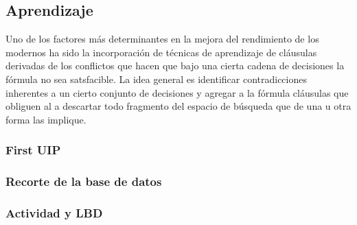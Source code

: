 \subsection{Aprendizaje}
Uno de los factores más determinantes en la mejora del rendimiento de los \ssolver modernos ha sido la incorporación de técnicas de aprendizaje de cláusulas derivadas de los conflictos que hacen que bajo una cierta cadena de decisiones la fórmula no sea satsfacible. La idea general es identificar contradicciones inherentes a un cierto conjunto de decisiones y agregar a la fórmula cláusulas que obliguen al \ssolver a descartar todo fragmento del espacio de búsqueda que de una u otra forma las implique.

\subsubsection{First UIP}
\subsubsection{Recorte de la base de datos}
\subsubsection{Actividad y LBD}


